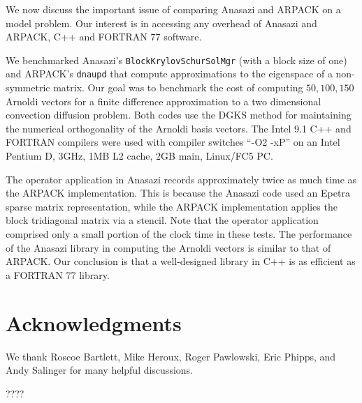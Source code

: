 \documentclass[acmtoms]{acmtrans2m}
\newcommand{\aspace}[1]{\texttt{#1}}
\begin{document}
We now discuss the important issue of comparing Anasazi and ARPACK
on a model problem. Our interest is in accessing any overhead of
Anasazi and ARPACK, C++ and FORTRAN 77 software.

We benchmarked Anasazi's \aspace{BlockKrylovSchurSolMgr} (with a block size
of one) and ARPACK's \aspace{dnaupd} that compute approximations to the
eigenspace of a non-symmetric matrix. Our goal was to benchmark the
cost of computing $50, 100, 150$ Arnoldi vectors for a finite
difference approximation to a two dimensional convection diffusion
problem. Both codes use the DGKS \cite{dgks:76} method for
maintaining the numerical orthogonality of the Arnoldi basis
vectors.  The Intel 9.1 C++ and FORTRAN compilers were used with
compiler switches ``-O2 -xP'' on an Intel Pentium D, 3GHz, 1MB L2
cache, 2GB main, Linux/FC5 PC.

The operator application in Anasazi records approximately twice as much time as the ARPACK
implementation. This is because the Anasazi code used an Epetra sparse matrix
representation, while the ARPACK implementation applies the block tridiagonal
matrix via a stencil. Note that the operator application comprised only a small
portion of the clock time in these tests. The performance of the Anasazi library in
computing the Arnoldi vectors is similar to that of ARPACK. Our conclusion is that a
well-designed library in C++ is as efficient as a FORTRAN 77 library.

\section{Acknowledgments}
We thank Roscoe Bartlett, Mike Heroux, Roger Pawlowski, Eric Phipps,
and Andy Salinger for many helpful discussions.





\begin{received}
????
\end{received}
\end{document}
